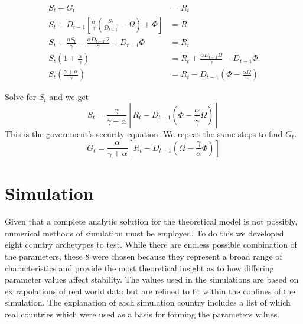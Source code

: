 \documentclass[12pt]{article}
\begin{document}
\begin{spacing}{1.5}
\begin{equation}
    \begin{aligned}
        S_t+G_t&=R_t \\
        S_t+  D_{t-1}\left[\frac{\alpha}{\gamma } \left(\frac{S_t}{ D_{t-1}} -\Omega \right) +\Phi \right]  &= R \\
S_t+ \frac{\alpha S_t}{\gamma } -\frac{\alpha  D_{t-1} \Omega}{\gamma } +D_{t-1}\Phi &=R_t \\
S_t\left(1+\frac{\alpha}{\gamma }\right) &= R_t+ \frac{\alpha D_{t-1} \Omega}{\gamma } - D_{t-1}\Phi \\
S_t\left(\frac{\gamma  + \alpha}{\gamma }\right) &= R_t - D_{t-1} \left(\Phi - \frac{\alpha  \Omega}{\gamma } \right) 
    \end{aligned}
\end{equation}


\noindent Solve for $S_t$ and we get
\begin{equation}
S_t=\frac{\gamma }{\gamma  +\alpha} \left[ R_t - D_{t-1} \left(\Phi - \frac{\alpha}{\gamma }\Omega \right) \right]
\end{equation}
\noindent This is the government's security equation. We repeat the same steps to find $G_t$. 
\begin{equation}
G_t=\frac{\alpha}{\gamma  +\alpha} \left[ R_t - D_{t-1} \left(\Omega - \frac{\gamma }{\alpha}\Phi \right) \right]
\end{equation}

\section{Simulation} 

Given that a complete analytic solution for the theoretical model is not possibly, numerical methods of simulation must be employed. To do this we developed eight country archetypes to test. While there are endless possible combination of the parameters, these 8 were chosen because they represent a broad range of characteristics and provide the most theoretical insight as to how differing parameter values affect stability. The values used in the simulations are based on extrapolations of real world data but are refined to fit within the confines of the simulation. The explanation of each simulation country includes a list of which real countries which were used as a basis for forming the parameters values. 


\end{spacing}
\end{document}
